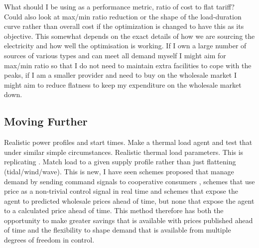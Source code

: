 \documentclass[11pt]{article}
\begin{document}
What should I be using as a performance metric, ratio of cost to flat tariff? Could also
look at max/min ratio reduction or the shape of the load-duration curve rather than overall cost if the optimization is changed to have this as its objective. This somewhat depends on the exact details of how we are sourcing the electricity and how well the optimisation is working. If I own a large number of sources of various types and can meet all demand myself I might aim for max/min ratio so that I do not need to maintain extra facilities to cope with the peaks, if I am a smaller provider and need to buy on the wholesale market I might aim to reduce flatness to keep my expenditure on the wholesale market down.

\subsection{Moving Further}
Realistic power profiles and start times. Make a thermal load agent and test that
under similar simple circumstances. Realistic thermal load parameters. This is replicating \cite{ramchurn2011agent}. Match load to a given supply profile rather than just flattening (tidal/wind/wave). This is new, I have seen schemes proposed that manage demand by sending command signals to cooperative consumers\cite{ramchurn2011agent2} , schemes that use price as a non-trivial control signal in real time and schemes that expose the agent to predicted wholesale prices ahead of time, but none that expose the agent to a calculated price ahead of time. This method therefore has both the opportunity to make greater savings that is available with prices published ahead of time and the flexibility to shape demand that is available from multiple degrees of freedom in control.
\end{document}
